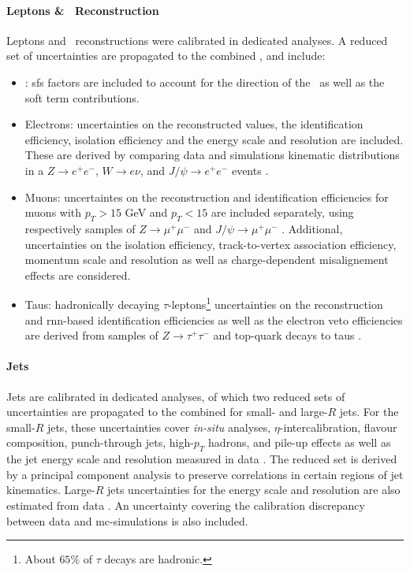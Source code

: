 \paragraph{Leptons \& \etm\ Reconstruction} Leptons and \etm\ reconstructions were calibrated in dedicated analyses. A reduced set of uncertainties are propagated to the combined \vhbc, and include:
\begin{itemize}
    \item \etm: \gls{sf}s factors are included to account for the direction of the \etm\ as well as the soft term contributions. %
    \item Electrons: uncertainties on the reconstructed values, the identification efficiency, isolation efficiency and the energy scale and resolution are included. These are derived by comparing data and simulations kinematic distributions in a $Z \rightarrow e^+ e^-$, $W\rightarrow e\nu$, and $J/\psi \rightarrow e^+e^-$ events \Cite{Aaboud:2657964}. 
    \item Muons: uncertaintes on the reconstruction and identification efficiencies for muons with $p_T > 15$ GeV and $p_T < 15$ are included separately, using respectively samples of $Z\rightarrow \mu^+\mu^-$ and $J/\psi \rightarrow \mu^+\mu^-$ \cite{Aad:2746302}. Additional, uncertainties on the isolation efficiency, track-to-vertex association efficiency, momentum scale and resolution as well as charge-dependent misalignement effects are considered. 
    \item Taus: hadronically decaying $\tau$-leptons\footnote{About $65$\% of $\tau$ decays are hadronic.} uncertainties on the reconstruction and \gls{rnn}-based identification efficiencies as well as the electron veto efficiencies are derived from samples of $Z\rightarrow\tau^+ \tau^-$ and top-quark decays to taus \cite{ATL-PHYS-PUB-2019-033, ATL-PHYS-PUB-2015-045, ATLAS-CONF-2017-029}.
\end{itemize}

\paragraph{Jets} Jets are calibrated in dedicated analyses, of which two reduced sets of uncertainties are propagated to the combined \vhbc for small- and large-$R$ jets. For the small-$R$ jets, these uncertainties cover \textit{in-situ} analyses, $\eta$-intercalibration, flavour composition, punch-through jets, high-$p_T$ hadrons, and pile-up effects as well as the jet energy scale and resolution measured in data \cite{ATLASjesjerMeas, Aad:2854733}. The reduced set is derived by a principal component analysis to preserve correlations in certain regions of jet kinematics. Large-$R$ jets uncertainties for the energy scale and resolution are also estimated from data \cite{ATLAS:2018bip}. An uncertainty covering the calibration discrepancy between data and \gls{mc}-simulations is also included.

